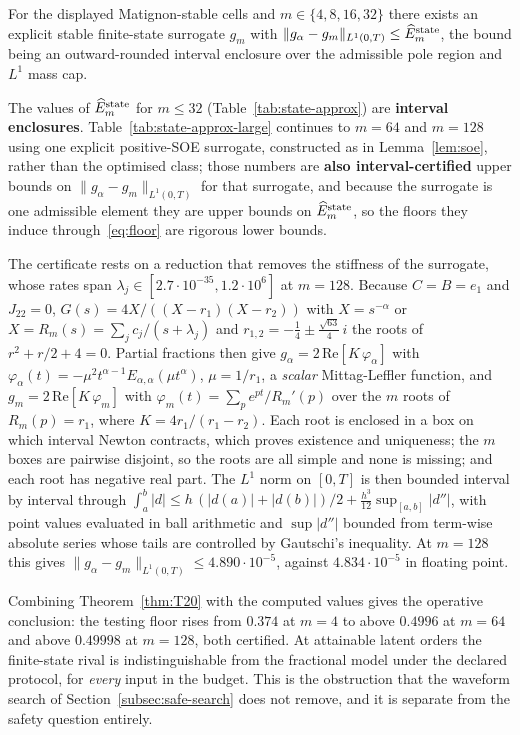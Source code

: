 \begin{theorem}
\label{thm:T23}
For the displayed Matignon-stable cells and $m\in\{4,8,16,32\}$ there exists an explicit stable finite-state surrogate $g_m$ with $\|g_\alpha-g_m\|_{L^1(0,T)}\le\widehat E_m^{\rm state}$, the bound being an outward-rounded interval enclosure over the admissible pole region and $L^1$ mass cap.
\end{theorem}

The values of $\widehat E_m^{\rm state}$ for $m\le32$ (Table~\ref{tab:state-approx}) are \textbf{interval enclosures}. Table~\ref{tab:state-approx-large} continues to $m=64$ and $m=128$ using one explicit positive-SOE surrogate, constructed as in Lemma~\ref{lem:soe}, rather than the optimised class; those numbers are \textbf{also interval-certified} upper bounds on $\|g_\alpha-g_m\|_{L^1(0,T)}$ for that surrogate, and because the surrogate is one admissible element they are upper bounds on $\widehat E_m^{\rm state}$, so the floors they induce through~\eqref{eq:floor} are rigorous lower bounds.

The certificate rests on a reduction that removes the stiffness of the surrogate, whose rates span $\lambda_j\in[2.7\cdot10^{-35},1.2\cdot10^{6}]$ at $m=128$. Because $C=B=e_1$ and $J_{22}=0$, $G(s)=4X/((X-r_1)(X-r_2))$ with $X=s^{-\alpha}$ or $X=R_m(s)=\sum_jc_j/(s+\lambda_j)$ and $r_{1,2}=-\tfrac14\pm\tfrac{\sqrt{63}}4\,i$ the roots of $r^2+r/2+4=0$. Partial fractions then give $g_\alpha=2\,\mathrm{Re}[K\,\varphi_\alpha]$ with $\varphi_\alpha(t)=-\mu^2t^{\alpha-1}E_{\alpha,\alpha}(\mu t^\alpha)$, $\mu=1/r_1$, a \emph{scalar} Mittag-Leffler function, and $g_m=2\,\mathrm{Re}[K\,\varphi_m]$ with $\varphi_m(t)=\sum_pe^{pt}/R_m'(p)$ over the $m$ roots of $R_m(p)=r_1$, where $K=4r_1/(r_1-r_2)$. Each root is enclosed in a box on which interval Newton contracts, which proves existence and uniqueness; the $m$ boxes are pairwise disjoint, so the roots are all simple and none is missing; and each root has negative real part. The $L^1$ norm on $[0,T]$ is then bounded interval by interval through $\int_a^b|d|\le h\,(|d(a)|+|d(b)|)/2+\tfrac{h^3}{12}\sup_{[a,b]}|d''|$, with point values evaluated in ball arithmetic and $\sup|d''|$ bounded from term-wise absolute series whose tails are controlled by Gautschi's inequality. At $m=128$ this gives $\|g_\alpha-g_m\|_{L^1(0,T)}\le4.890\cdot10^{-5}$, against $4.834\cdot10^{-5}$ in floating point.

Combining Theorem~\ref{thm:T20} with the computed values gives the operative conclusion: the testing floor rises from $0.374$ at $m=4$ to above $0.4996$ at $m=64$ and above $0.49998$ at $m=128$, both certified. At attainable latent orders the finite-state rival is indistinguishable from the fractional model under the declared protocol, for \emph{every} input in the budget. This is the obstruction that the waveform search of Section~\ref{subsec:safe-search} does not remove, and it is separate from the safety question entirely.

